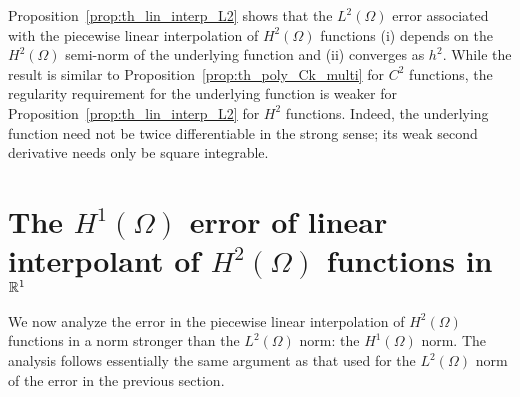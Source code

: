 Proposition~\ref{prop:th_lin_interp_L2} shows that the $L^2(\Omega)$ error associated with the piecewise linear interpolation of $H^2(\Omega)$ functions (i) depends on the $H^2(\Omega)$ semi-norm of the underlying function and (ii) converges as $h^2$. While the result is similar to Proposition~\ref{prop:th_poly_Ck_multi} for $C^2$ functions, the regularity requirement for the underlying function is weaker for Proposition~\ref{prop:th_lin_interp_L2} for $H^2$ functions.  Indeed, the underlying function need not be twice differentiable in the strong sense; its weak second derivative needs only be square integrable.


\section{The $H^1(\Omega)$ error of linear interpolant of $H^2(\Omega)$ functions in $\mathbb{R}^1$}
\label{sec:th_interp_h1_h2}
  We now analyze the error in the piecewise linear interpolation of $H^2(\Omega)$ functions in a norm stronger than the $L^2(\Omega)$ norm: the $H^1(\Omega)$ norm.  The analysis follows essentially the same argument as that used for the $L^2(\Omega)$ norm of the error in the previous section.
